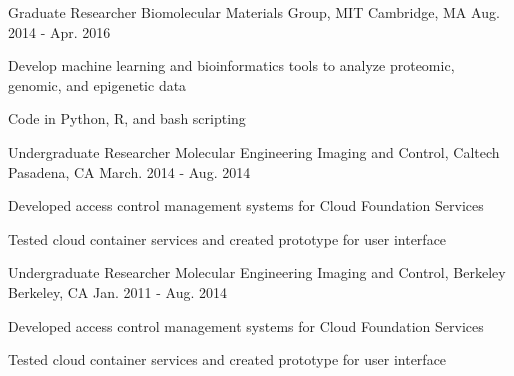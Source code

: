 

\begin{cventries}

\cventry
    {Graduate Researcher} %
    {Biomolecular Materials Group, MIT} %
    {Cambridge, MA} %
    {Aug. 2014 - Apr. 2016} %
    {
      \begin{cvitems} %
        \item {Develop machine learning  and bioinformatics tools to analyze proteomic, genomic, and epigenetic data}
        \item {Code in Python, R, and bash scripting}
      \end{cvitems}
    }

 \cventry
    {Undergraduate Researcher} %
    {Molecular Engineering Imaging and Control, Caltech} %
    {Pasadena, CA} %
    {March. 2014 - Aug. 2014} %
    {
      \begin{cvitems} %
        \item {Developed access control management systems for Cloud Foundation Services}
        \item {Tested cloud container services and created prototype for user interface}
      \end{cvitems}
    }

 \cventry
    {Undergraduate Researcher} %
    {Molecular Engineering Imaging and Control, Berkeley} %
    {Berkeley, CA} %
    {Jan. 2011 - Aug. 2014} %
    {
      \begin{cvitems} %
        \item {Developed access control management systems for Cloud Foundation Services}
        \item {Tested cloud container services and created prototype for user interface}
      \end{cvitems}
    }

\end{cventries}
